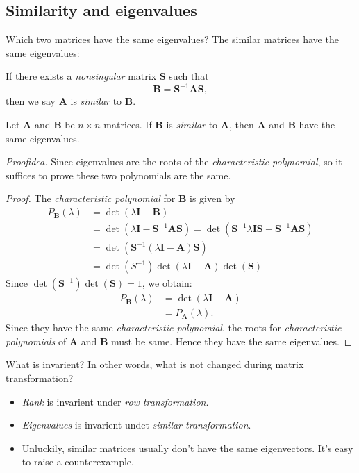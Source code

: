 \subsection{Similarity and eigenvalues}
Which two matrices have the same eigenvalues? The similar matrices have the same eigenvalues:
\begin{definition}[Similar]
If there exists a \textit{nonsingular} matrix $\bm S$ such that
\[
\bm B=\bm S^{-1}\bm A\bm S,
\]
then we say $\bm A$ is \emph{similar} to $\bm B$.
\end{definition}
\begin{proposition}\label{proposition_15.1}
Let $\bm A$ and $\bm B$ be $n\times n$ matrices. If $\bm B$ is \textit{similar} to $\bm A$, then $\bm A$ and $\bm B$ have the same eigenvalues.
\end{proposition}
\textit{Proofidea.} Since eigenvalues are the roots of the \textit{characteristic polynomial}, so it suffices to prove these two polynomials are the same.
\begin{proof}
The \textit{characteristic polynomial} for $\bm B$ is given by
\begin{align*}
P_{\bm B}(\lambda)&=\det(\lambda\bm I-\bm B)\\
&=\det(\lambda\bm I-\bm S^{-1}\bm A\bm S)=\det(\bm S^{-1}\lambda\bm I\bm S-\bm S^{-1}\bm A\bm S)\\
&=\det(\bm S^{-1}(\lambda\bm I-\bm A)\bm S)\\
&=\det(S^{-1})\det(\lambda\bm I-\bm A)\det(\bm S)
\end{align*}
Since $\det(\bm S^{-1})\det(\bm S)=1$, we obtain:
\begin{align*}
P_{\bm B}(\lambda)&=\det(\lambda\bm I-\bm A)\\
&=P_{\bm A}(\lambda).
\end{align*}
Since they have the same \textit{characteristic polynomial}, the roots for \textit{characteristic polynomials} of $\bm A$ and $\bm B$ must be same. Hence they have the same eigenvalues.
\end{proof}
\begin{remark}
What is invarient? In other words, what is not changed during matrix transformation?
\begin{itemize}
\item
\emph{Rank} is invarient under \textit{row transformation}.
\item
\emph{Eigenvalues} is invarient undet \textit{similar transformation}.
\item
Unluckily, similar matrices usually don't have the same eigenvectors. It's easy to raise a counterexample.
\end{itemize}
\end{remark}
